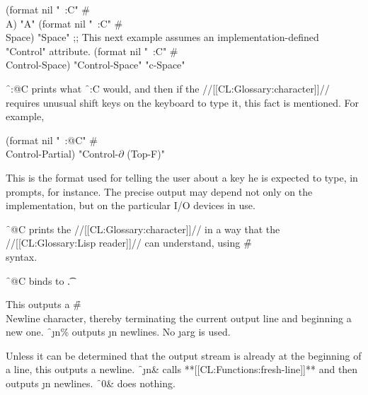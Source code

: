 \code
 (format nil "~:C" #\\A) \EV "A"
 (format nil "~:C" #\\Space) \EV "Space"
;; This next example assumes an implementation-defined "Control" attribute.
 (format nil "~:C" #\\Control-Space)
\EV "Control-Space"
\OV "c-Space"
\endcode


\f{~:@C} prints what \f{~:C} would, and then
if the //[[CL:Glossary:character]]// requires unusual shift keys on the keyboard to type it,
this fact is mentioned.  For example,

\begingroup
\def\Partial{$\partial$}
\code
 (format nil "~:@C" #\\Control-Partial) \EV "Control-{\Partial} (Top-F)"  
\endcode
\endgroup

This is the format used for telling the user about a key he is expected to type,
in prompts, for instance.  The precise output may depend not only
on the implementation, but on the particular I/O devices in use.
                           

\f{~@C} 
prints the //[[CL:Glossary:character]]// in a way that the //[[CL:Glossary:Lisp reader]]// can understand,
using \f{\#\\} syntax.

\f{~@C}  binds  to \t.


\endsubsubsection%




This outputs a \f{\#\\Newline} character, thereby terminating the current
output line and beginning a new one.
\f{~\j{n}\%} outputs \j{n} newlines.
No \j{arg} is used.  

\endsubsubsection%




Unless it can be determined that the output stream
is already at the beginning of a line,
this outputs a newline.
\f{~\j{n}\&} calls **[[CL:Functions:fresh-line]]**
and then outputs \j{n} newlines.
\f{~0\&} does nothing.

\endsubsubsection%

